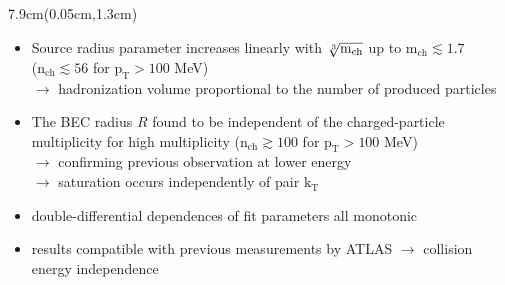 \documentclass[xcolor=dvipsnames]{beamer}
\begin{document}
\begin{frame}
\begin{textblock*}{7.9cm}(0.05cm,1.3cm)
\footnotesize{
\begin{itemize}
 \item Source radius parameter increases linearly with $\root 3 \of {\mathrm{m}_\mathrm{ch}}$ up to $\mathrm{m}_\mathrm{ch}\lesssim 1.7$ \\($\mathrm{n}_\mathrm{ch}\lesssim 56$ for $\mathrm{p}_\mathrm{T} > 100$ MeV)  \\$\rightarrow$ hadronization volume proportional to the number of produced particles\\\vspace{0.25cm}
 \item The BEC radius $R$ found to be independent of the charged-particle multiplicity for high multiplicity ($\mathrm{n}_\mathrm{ch}\gtrsim 100$ for $\mathrm{p}_\mathrm{T} > 100$ MeV)\\
$\rightarrow$ confirming previous observation at lower energy\\
$\rightarrow$ saturation occurs independently of pair $\mathrm{k}_\mathrm{T}$\\\vspace{0.cm}
 \item double-differential dependences of fit parameters all monotonic\\\vspace{0.25cm}
 \item results compatible with previous measurements by ATLAS $\rightarrow$ collision energy independence
\end{itemize}
}
\end{textblock*}
\end{frame}
\end{document}
